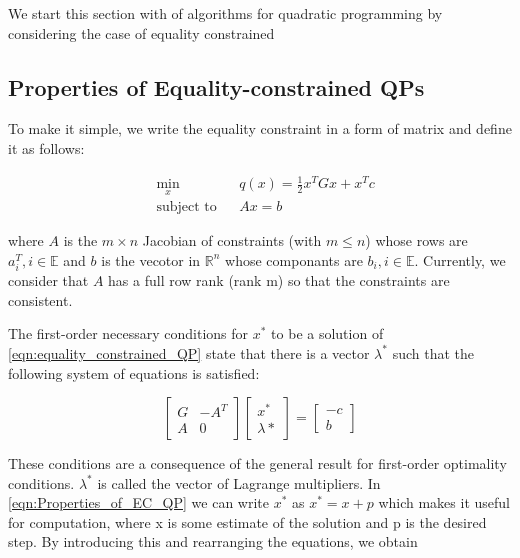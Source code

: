 We start this section with of algorithms for quadratic programming by considering the case of equality constrained

\subsection*{Properties of Equality-constrained QPs}
To make it simple, we write the equality constraint in a form of matrix and define it as follows:

\begin{equation}
\begin{aligned}
& \underset{x}{\text{min}}
& & q(x)= \frac{1}{2}x^{T}Gx+x^{T}c \\
& \text{subject to} & &  Ax=b
\end{aligned}
\label{eqn:equality_constrained_QP}
\end{equation}

where $A$ is the $m\times n$ Jacobian of constraints (with $m\leqslant n$) whose rows are $a_i^T,i \in \mathbb{E}$ and $b$ is the vecotor in $\mathbb{R}^n$ whose componants are $b_i, i \in \mathbb{E}$. Currently, we consider that $A$ has a full row rank (rank m) so that the constraints are consistent.

The first-order necessary conditions for $x^*$ to be a solution of \ref{eqn:equality_constrained_QP} state that there is a vector $\lambda^*$ such that the following system of equations is satisfied:

\begin{equation}
\begin{bmatrix}
  	G & -A^T \\
    A & 0
  \end{bmatrix}
  \begin{bmatrix}
  	x^* \\
    \lambda{*}
  \end{bmatrix}
  =
  \begin{bmatrix}
  	-c \\
    b
  \end{bmatrix}	
  \label{eqn:Properties_of_EC_QP}
\end{equation}

These conditions are a consequence of the general result for first-order optimality conditions.  $\lambda^*$ is called the vector of Lagrange multipliers. In \ref{eqn:Properties_of_EC_QP} we can write $x^*$ as $x^* = x+p$ which makes it useful for computation, where x is some estimate of the solution and p is the desired step. By introducing this and rearranging the equations, we obtain

